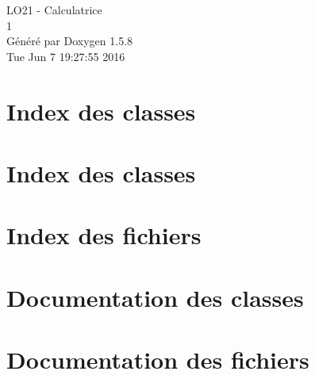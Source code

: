 \documentclass[a4paper]{book}
\begin{document}
\begin{titlepage}
\vspace*{7cm}
\begin{center}
{\Large LO21 - Calculatrice \\[1ex]\large 1 }\\
\vspace*{1cm}
{\large Généré par Doxygen 1.5.8}\\
\vspace*{0.5cm}
{\small Tue Jun 7 19:27:55 2016}\\
\end{center}
\end{titlepage}
\clearemptydoublepage
{}
\tableofcontents
\clearemptydoublepage
{}
\chapter{Index des classes}

\chapter{Index des classes}

\chapter{Index des fichiers}

\chapter{Documentation des classes}

















\chapter{Documentation des fichiers}


\printindex
\end{document}

